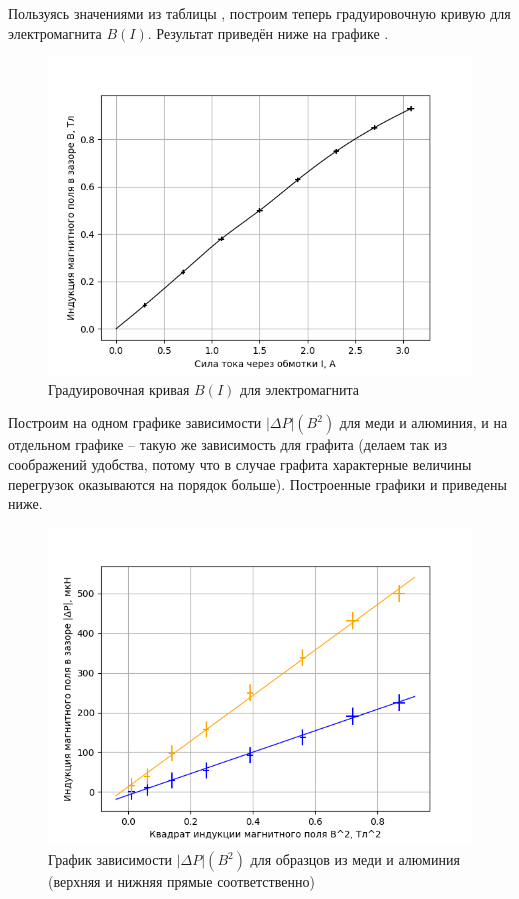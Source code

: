 \documentclass[a4paper,12pt]{article}
\begin{document}
Пользуясь значениями из таблицы , построим теперь градуировочную кривую для электромагнита $B(I)$. Результат приведён ниже на графике .

\begin{figure}[h]
	\centering
	\includegraphics[scale = 0.8]{Curve}
	\caption{Градуировочная кривая $B(I)$ для электромагнита} \label{Кривая}
\end{figure} 

Построим на одном графике зависимости $\left|\Delta P\right|(B^2)$ для меди и алюминия, и на отдельном графике -- такую же зависимость для графита (делаем так из соображений удобства, потому что в случае графита характерные величины перегрузок оказываются на порядок больше). Построенные графики  и  приведены ниже.

\begin{figure}[h]
	\centering
	\includegraphics[scale = 0.8]{Plot}
	\caption{График зависимости $\left|\Delta P\right|(B^2)$ для образцов из меди и алюминия (верхняя и нижняя прямые соответственно)} \label{Прямые}
\end{figure} 
\end{document}

